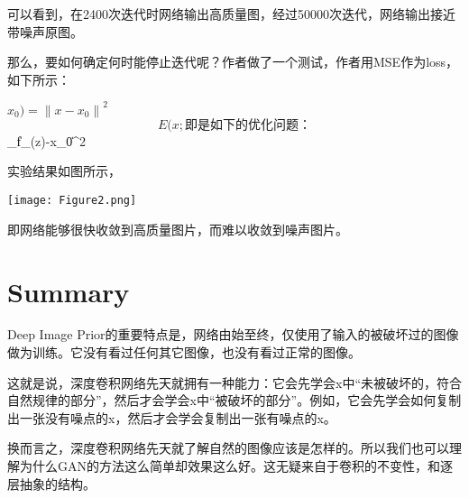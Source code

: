 \documentclass[10pt, letterpaper]{article}
\begin{document}
可以看到，在2400次迭代时网络输出高质量图，经过50000次迭代，网络输出接近带噪声原图。

那么，要如何确定何时能停止迭代呢？作者做了一个测试，作者用MSE作为loss，如下所示：

$x_0)={\|x-x_0\|}^2
$$$
E(x;

即是如下的优化问题：

$$
\min_{\theta}{\|f_\theta(z)-x_0\|}^2
$$

实验结果如图所示，

\begin{center}
\texttt{[image: Figure2.png]}
\end{center}\par

即网络能够很快收敛到高质量图片，而难以收敛到噪声图片。

\section{Summary}

Deep Image Prior的重要特点是，网络由始至终，仅使用了输入的被破坏过的图像做为训练。它没有看过任何其它图像，也没有看过正常的图像。

这就是说，深度卷积网络先天就拥有一种能力：它会先学会x中“未被破坏的，符合自然规律的部分”，然后才会学会x中“被破坏的部分”。例如，它会先学会如何复制出一张没有噪点的x，然后才会学会复制出一张有噪点的x。

换而言之，深度卷积网络先天就了解自然的图像应该是怎样的。所以我们也可以理解为什么GAN的方法这么简单却效果这么好。这无疑来自于卷积的不变性，和逐层抽象的结构。
\end{document}
